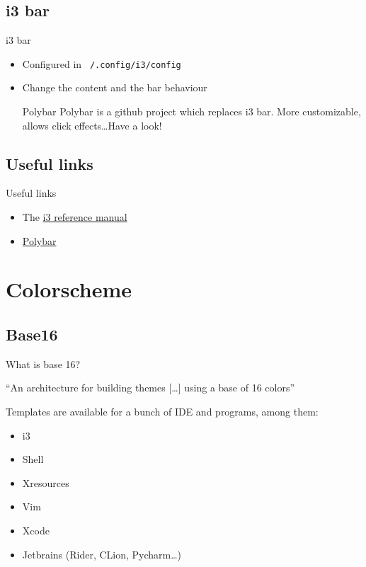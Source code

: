 \documentclass{beamer}
\begin{document}
\subsection*{i3 bar}
\begin{frame}{i3 bar}
  \begin{itemize}
    \item Configured in \texttt{~/.config/i3/config}
    \item Change the content and the bar behaviour
      \begin{block}{Polybar}
        Polybar is a github project which replaces i3 bar. More customizable, allows click effects\dots Have a look!
      \end{block}
  \end{itemize}
\end{frame}

\subsection*{Useful links}
\begin{frame}{Useful links}
  \begin{itemize}
    \item The \href{https://i3wm.org/docs/userguide.html}{i3 reference manual}
    \item \href{https://github.com/jaagr/polybar}{Polybar}
  \end{itemize}
\end{frame}

\section{Colorscheme}
\subsection*{Base16}
\begin{frame}{What is base 16?}

  \enquote{An architecture for building themes [\dots] using a base of 16 colors}

Templates are available for a bunch of IDE and programs, among them:

  \small
  \begin{itemize}
    \item i3
    \item Shell
    \item Xresources
    \item Vim
    \item Xcode
    \item Jetbrains (Rider, CLion, Pycharm\dots)
  \end{itemize}
  \normalsize

\end{frame}
\end{document}
